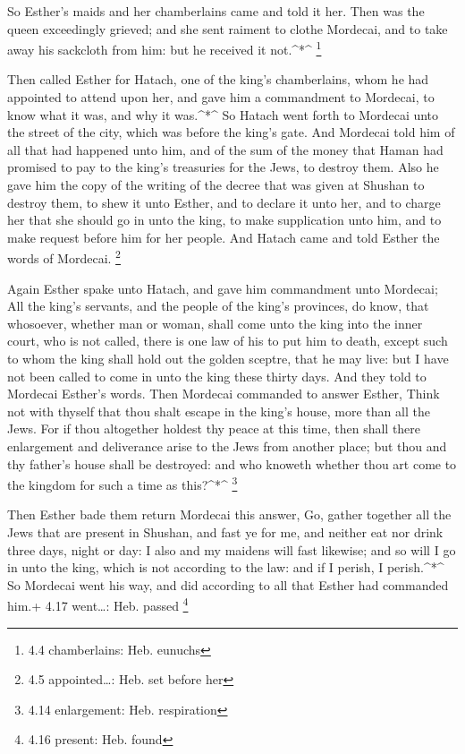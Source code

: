  So Esther's maids and her chamberlains came and told it
her. Then was the queen exceedingly grieved; and she sent raiment to
clothe Mordecai, and to take away his sackcloth from him: but he
received it not.\^{}*\^{} \footnote{4.4 chamberlains: Heb. eunuchs}

 Then called Esther for Hatach, one of the king's
chamberlains, whom he had appointed to attend upon her, and gave him a
commandment to Mordecai, to know what it was, and why it was.\^{}*\^{}
 So Hatach went forth to Mordecai unto the street of the
city, which was before the king's gate.  And Mordecai told
him of all that had happened unto him, and of the sum of the money that
Haman had promised to pay to the king's treasuries for the Jews, to
destroy them.  Also he gave him the copy of the writing of
the decree that was given at Shushan to destroy them, to shew it unto
Esther, and to declare it unto her, and to charge her that she should go
in unto the king, to make supplication unto him, and to make request
before him for her people.  And Hatach came and told Esther
the words of Mordecai. \footnote{4.5 appointed\ldots: Heb. set before
  her}

 Again Esther spake unto Hatach, and gave him commandment
unto Mordecai;  All the king's servants, and the people of
the king's provinces, do know, that whosoever, whether man or woman,
shall come unto the king into the inner court, who is not called, there
is one law of his to put him to death, except such to whom the king
shall hold out the golden sceptre, that he may live: but I have not been
called to come in unto the king these thirty days.  And
they told to Mordecai Esther's words.  Then Mordecai
commanded to answer Esther, Think not with thyself that thou shalt
escape in the king's house, more than all the Jews.  For if
thou altogether holdest thy peace at this time, then shall there
enlargement and deliverance arise to the Jews from another place; but
thou and thy father's house shall be destroyed: and who knoweth whether
thou art come to the kingdom for such a time as this?\^{}*\^{}
\footnote{4.14 enlargement: Heb. respiration}

 Then Esther bade them return Mordecai this answer,
 Go, gather together all the Jews that are present in
Shushan, and fast ye for me, and neither eat nor drink three days, night
or day: I also and my maidens will fast likewise; and so will I go in
unto the king, which is not according to the law: and if I perish, I
perish.\^{}*\^{}  So Mordecai went his way, and did
according to all that Esther had commanded him.+ 4.17 went\ldots: Heb.
passed \footnote{4.16 present: Heb. found}

